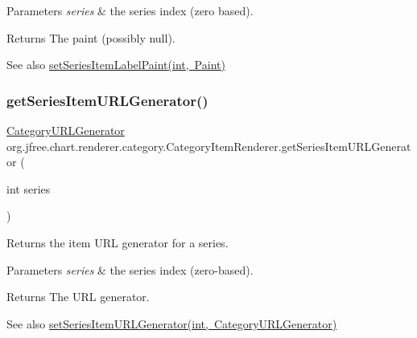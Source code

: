 \begin{DoxyParams}{Parameters}
{\em series} & the series index (zero based).\\
\hline
\end{DoxyParams}
\begin{DoxyReturn}{Returns}
The paint (possibly {\ttfamily null}).
\end{DoxyReturn}
\begin{DoxySeeAlso}{See also}
\mbox{\hyperlink{interfaceorg_1_1jfree_1_1chart_1_1renderer_1_1category_1_1_category_item_renderer_a5073e180fe38cae12d94d539796f7a29}{set\+Series\+Item\+Label\+Paint(int, Paint)}} 
\end{DoxySeeAlso}
\mbox{\label{interfaceorg_1_1jfree_1_1chart_1_1renderer_1_1category_1_1_category_item_renderer_a64d80a830a7a1e182659b29054f9c4fb}} 
\subsubsection{\texorpdfstring{get\+Series\+Item\+U\+R\+L\+Generator()}{getSeriesItemURLGenerator()}}
{\footnotesize\ttfamily \mbox{\hyperlink{interfaceorg_1_1jfree_1_1chart_1_1urls_1_1_category_u_r_l_generator}{Category\+U\+R\+L\+Generator}} org.\+jfree.\+chart.\+renderer.\+category.\+Category\+Item\+Renderer.\+get\+Series\+Item\+U\+R\+L\+Generator (\begin{DoxyParamCaption}\item[{int}]{series }\end{DoxyParamCaption})}

Returns the item U\+RL generator for a series.


\begin{DoxyParams}{Parameters}
{\em series} & the series index (zero-\/based).\\
\hline
\end{DoxyParams}
\begin{DoxyReturn}{Returns}
The U\+RL generator.
\end{DoxyReturn}
\begin{DoxySeeAlso}{See also}
\mbox{\hyperlink{interfaceorg_1_1jfree_1_1chart_1_1renderer_1_1category_1_1_category_item_renderer_aff7f034084c4edb10cacc73c96a6a311}{set\+Series\+Item\+U\+R\+L\+Generator(int, Category\+U\+R\+L\+Generator)}} 
\end{DoxySeeAlso}


